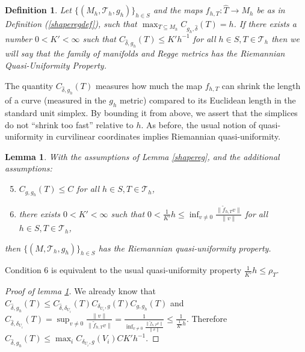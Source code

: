 \documentclass[11pt]{article}
\newtheorem{definition}[theorem]{Definition}
\newtheorem{lemma}[theorem]{Lemma}
\newcommand{\correction}[2]{\textcolor{red}{}\textcolor{black}{#2}}
\begin{document}
\begin{definition}\label{quasiuniformdef}
Let $\{(M_h,\mathcal{T}_h,g_h)\}_{h \in S}$ and the maps $f_{h,T}: \hat{T} \to M_h$ be as in Definition (\ref{shaperegdef}), such that $\max_{T \subseteq M_h} C_{g_h,\hat\delta}(T) = h$. If there exists a number $0 < K' < \infty$ such that $C_{\hat\delta,g_h}(T)\le K'h^{-1}$ for all $h \in S, T \in \mathcal{T}_h$ then we will say that the family of manifolds and Regge metrics has the \emph{Riemannian Quasi-Uniformity Property}.
\end{definition}

The quantity $C_{\hat\delta,g_h}(T)$ measures how much the map $f_{h,T}$ can shrink the length of a curve (measured in the $g_h$ metric) compared to its Euclidean length in the standard unit simplex. By bounding it from above, we assert that the simplices  do not ``shrink too fast'' relative to $h$. As before, the usual notion of quasi-uniformity in curvilinear coordinates implies Riemannian\correction{-}{} quasi-uniformity.

\begin{lemma}\label{quasiuniform}
With the assumptions of Lemma \ref{shapereg}, and the additional assumptions:

\begin{enumerate}
\setcounter{enumi}{4}
\item{$C_{g,g_h}(T) \le C$ for all $h \in S, T \in \mathcal{T}_h$},
\item{there exists $0 < K' < \infty$ such that $0 < \frac{1}{K'}h \le \inf_{v \ne 0} \frac{\|\tilde{f}_{h,T}v\|}{\|v\|}$ for all $h \in S, T \in \mathcal{T}_h$},
\end{enumerate}
then $\{(M,\mathcal{T}_h,g_h)\}_{h \in S}$ has the Riemannian quasi-uniformity property.
\end{lemma}
Condition 6 is equivalent to the usual quasi-uniformity property $\frac{1}{K'}h \le \rho_T$.
\begin{proof}[Proof of lemma \ref{quasiuniform}]
We already know that $C_{\hat \delta,g_h}(T) \le C_{\hat \delta,\delta_{U_i}}(T)C_{\delta_{U_i},g}(T)C_{g,g_h}(T)$ and $C_{\hat \delta,\delta_{U_i}}(T) = \sup_{v \ne 0} \frac{\|v\|}{\|\tilde{f}_{h,T}v\|} = \frac{1}{\inf_{v \ne 0} \frac{\|\tilde{f}_{h,T}v\|}{\|v\|}} \le \frac{1}{\frac{1}{K'}h}$. Therefore $C_{\hat \delta,g_h}(T) \le \max_iC_{\delta_{U_i},g}(V_i)C K'h^{-1}$.
\end{proof}
\end{document}
